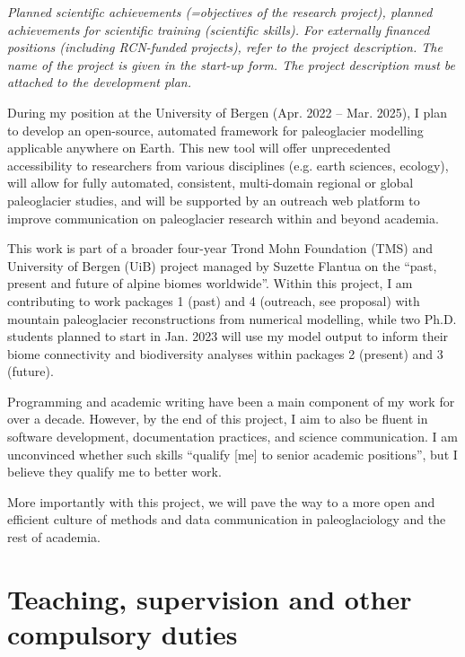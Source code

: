 \documentclass{article}
\newcommand{\guideline}[1]{{\color{color2}\itshape{#1}}}
\begin{document}
    \guideline{
        Planned scientific achievements (=objectives of the research project),
        planned achievements for scientific training (scientific skills). For
        externally financed positions (including RCN-funded projects), refer to
        the project description. The name of the project is given in the
        start-up form.  The project description must be attached to the
        development plan.}

    During my position at the University of Bergen (Apr. 2022 -- Mar. 2025), I
    plan to develop an open-source, automated framework for paleoglacier
    modelling applicable anywhere on Earth. This new tool will offer
    unprecedented accessibility to researchers from various disciplines (e.g.
    earth sciences, ecology), will allow for fully automated, consistent,
    multi-domain regional or global paleoglacier studies, and will be supported
    by an outreach web platform to improve communication on paleoglacier
    research within and beyond academia.

    This work is part of a broader four-year Trond Mohn Foundation (TMS) and
    University of Bergen (UiB) project managed by Suzette Flantua on the
    ``past, present and future of alpine biomes worldwide''. Within this
    project, I am contributing to work packages 1 (past) and
    4 (outreach, see proposal) with mountain paleoglacier reconstructions from
    numerical modelling, while two Ph.D. students planned to start in
    Jan. 2023 will use my model output to inform their biome connectivity and
    biodiversity analyses within packages 2 (present) and 3 (future).

    Programming and academic writing have been a main component of my work for
    over a decade. However, by the end of this project, I aim to also be
    fluent in software development, documentation practices, and science
    communication.
    I am unconvinced whether such skills ``qualify [me] to
    senior academic positions'', but I believe they qualify me to better work.

    More importantly with this project, we will pave the way to a more open and
    efficient culture of methods and data communication in paleoglaciology
    and the rest of academia.


\section{Teaching, supervision and other compulsory duties}
\end{document}
